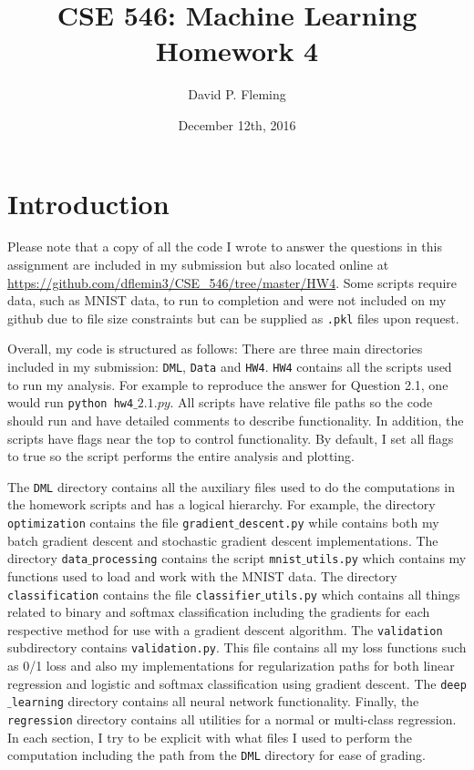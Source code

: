 \documentclass[12pt]{amsart}
\title{CSE 546: Machine Learning Homework 4}
\author{David P. Fleming}
\date{December 12th, 2016}
\begin{document}
\maketitle
\tableofcontents

\section*{Introduction}

Please note that a copy of all the code I wrote to answer the questions in this assignment are included in my submission but also located online at \url{https://github.com/dflemin3/CSE_546/tree/master/HW4}.  Some scripts require data, such as MNIST data, to run to completion and were not included on my github due to file size constraints but can be supplied as {\tt .pkl} files upon request.  

Overall, my code is structured as follows:  There are three main directories included in my submission: {\tt DML}, {\tt Data} and {\tt HW4}. {\tt HW4} contains all the scripts used to run my analysis.  For example to reproduce the answer for Question 2.1, one would run {\tt python hw4$\_2.1.py$}.  All scripts have relative file paths so the code should run and have detailed comments to describe functionality.  In addition, the scripts have flags near the top to control functionality.  By default, I set all flags to true so the script performs the entire analysis and plotting.  

The {\tt DML} directory contains all the auxiliary files used to do the computations in the homework scripts and has a logical hierarchy.  For example, the directory {\tt optimization} contains the file {\tt gradient$\_$descent.py} while contains both my batch gradient descent and stochastic gradient descent implementations.  The directory {\tt data$\_$processing} contains the script {\tt mnist$\_$utils.py} which contains my functions used to load and work with the MNIST data.  The directory {\tt classification} contains the file {\tt classifier$\_$utils.py} which contains all things related to binary and softmax classification including the gradients for each respective method for use with a gradient descent algorithm.  The {\tt validation} subdirectory contains {\tt validation.py}.  This file contains all my loss functions such as 0/1 loss and also my implementations for regularization paths for both linear regression and logistic and softmax classification using gradient descent.  The {\tt deep$\_$learning} directory contains all neural network functionality.  Finally, the {\tt regression} directory contains all utilities for a normal or multi-class regression.  In each section, I try to be explicit with what files I used to perform the computation including the path from the {\tt DML} directory for ease of grading.
\end{document}
